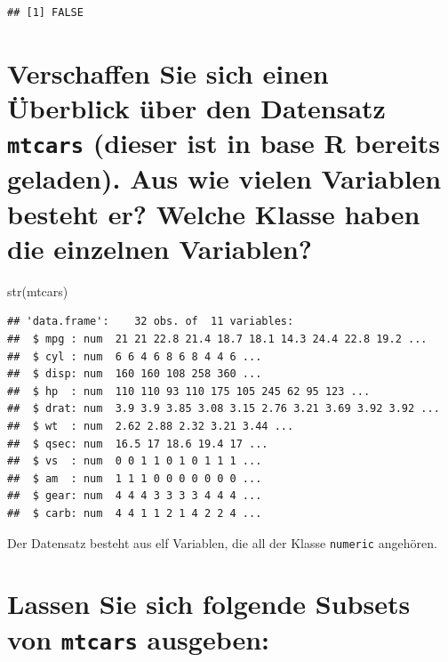 \documentclass[12pt,a4paper]{article}
\newenvironment{Shaded}{\begin{snugshade}}{\end{snugshade}}
\newcommand{\FunctionTok}[1]{\textcolor[rgb]{0.00,0.00,0.00}{#1}}
\newcommand{\NormalTok}[1]{#1}
\begin{document}
\begin{verbatim}
## [1] FALSE
\end{verbatim}

\hypertarget{verschaffen-sie-sich-einen-uxfcberblick-uxfcber-den-datensatz-mtcars-dieser-ist-in-base-r-bereits-geladen.-aus-wie-vielen-variablen-besteht-er-welche-klasse-haben-die-einzelnen-variablen}{%
\section{\texorpdfstring{Verschaffen Sie sich einen Überblick über den
Datensatz \texttt{mtcars} (dieser ist in base R bereits geladen). Aus
wie vielen Variablen besteht er? Welche Klasse haben die einzelnen
Variablen?}{Verschaffen Sie sich einen Überblick über den Datensatz mtcars (dieser ist in base R bereits geladen). Aus wie vielen Variablen besteht er? Welche Klasse haben die einzelnen Variablen?}}\label{verschaffen-sie-sich-einen-uxfcberblick-uxfcber-den-datensatz-mtcars-dieser-ist-in-base-r-bereits-geladen.-aus-wie-vielen-variablen-besteht-er-welche-klasse-haben-die-einzelnen-variablen}}

\begin{Shaded}
\begin{Highlighting}[]
    \FunctionTok{str}\NormalTok{(mtcars)}
\end{Highlighting}
\end{Shaded}

\begin{verbatim}
## 'data.frame':    32 obs. of  11 variables:
##  $ mpg : num  21 21 22.8 21.4 18.7 18.1 14.3 24.4 22.8 19.2 ...
##  $ cyl : num  6 6 4 6 8 6 8 4 4 6 ...
##  $ disp: num  160 160 108 258 360 ...
##  $ hp  : num  110 110 93 110 175 105 245 62 95 123 ...
##  $ drat: num  3.9 3.9 3.85 3.08 3.15 2.76 3.21 3.69 3.92 3.92 ...
##  $ wt  : num  2.62 2.88 2.32 3.21 3.44 ...
##  $ qsec: num  16.5 17 18.6 19.4 17 ...
##  $ vs  : num  0 0 1 1 0 1 0 1 1 1 ...
##  $ am  : num  1 1 1 0 0 0 0 0 0 0 ...
##  $ gear: num  4 4 4 3 3 3 3 4 4 4 ...
##  $ carb: num  4 4 1 1 2 1 4 2 2 4 ...
\end{verbatim}

Der Datensatz besteht aus elf Variablen, die all der Klasse
\texttt{numeric} angehören.

\hypertarget{lassen-sie-sich-folgende-subsets-von-mtcars-ausgeben}{%
\section{\texorpdfstring{Lassen Sie sich folgende Subsets von
\texttt{mtcars}
ausgeben:}{Lassen Sie sich folgende Subsets von mtcars ausgeben:}}\label{lassen-sie-sich-folgende-subsets-von-mtcars-ausgeben}}
\end{document}

